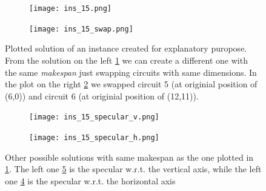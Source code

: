         \begin{figure}[H]
            \centering
            \begin{subfigure}[b]{0.45\textwidth}
                \centering 
                \texttt{[image: ins\_15.png]}
                \caption{}
                \label{fig:ins_15_mod}
            \end{subfigure}
            \hfill
            \begin{subfigure}[b]{0.45\textwidth}
                \centering
                \texttt{[image: ins\_15\_swap.png]}
                \caption{}
                \label{fig:ins_15_swap}
            \end{subfigure}
            \hfill
            \caption{
                Plotted solution of an instance created for explanatory puropose.
                From the solution on the left \ref{fig:ins_15_mod} we can create a different one
                with the same \textit{makespan} just swapping circuits with same dimensions. In
                the plot on the right \ref{fig:ins_15_swap} we swapped circuit 5 (at originial
                position of (6,0)) and circuit 6 (at originial position of (12,11)).
            }
            \label{fig:symmetry_swap}
        \end{figure}
       
        \begin{figure}[H]
            \centering
            \begin{subfigure}[b]{0.45\textwidth}
                \centering
                \texttt{[image: ins\_15\_specular\_v.png]}
                \caption{}
                \label{fig:ins_15_specular_v}
            \end{subfigure}
            \hfill
            \begin{subfigure}[b]{0.45\textwidth}
                \centering 
                \texttt{[image: ins\_15\_specular\_h.png]}
                \caption{}
                \label{fig:ins_15_specular_h}
            \end{subfigure}
            \hfill
            \caption{
                Other possible solutions with same makespan as the one plotted in \ref{fig:ins_15_mod}.
                The left one \ref{fig:ins_15_specular_h} is the specular w.r.t. the vertical axis,
                while the left one \ref{fig:ins_15_specular_v} is the specular w.r.t. the horizontal axis
            }
            \label{fig:symmetry_specular}
        \end{figure}

